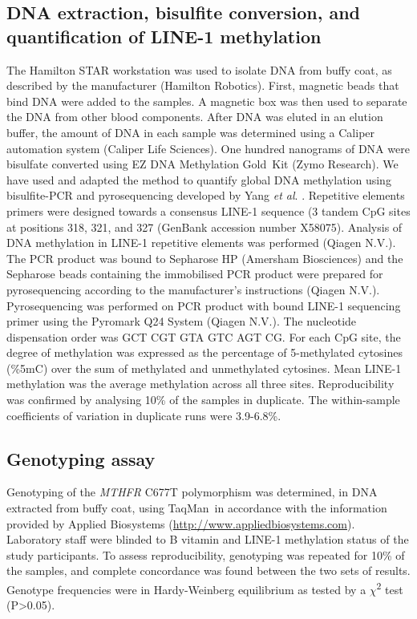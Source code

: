 \subsection{DNA extraction, bisulfite conversion, and quantification of LINE-1 methylation} %
\noindent The Hamilton STAR workstation was used to isolate DNA from buffy coat, as described by the manufacturer (Hamilton Robotics). First, magnetic beads that bind DNA were added to the samples. A magnetic box was then used to separate the DNA from other blood components. After DNA was eluted in an elution buffer, the amount of DNA in each sample was determined using a Caliper automation system (Caliper Life Sciences). One hundred nanograms of DNA were bisulfate converted using EZ DNA Methylation Gold\texttrademark~Kit (Zymo Research). We have used and adapted the method to quantify global DNA methylation using bisulfite-PCR and pyrosequencing developed by Yang \emph{et al}. \cite{c328}. Repetitive elements primers were designed towards a consensus LINE-1 sequence (3 tandem CpG sites at positions 318, 321, and 327 (GenBank accession number X58075). Analysis of DNA methylation in LINE-1 repetitive elements was performed (Qiagen N.V.). The PCR product was bound to Sepharose HP (Amersham Biosciences) and the Sepharose beads containing the immobilised PCR product were prepared for pyrosequencing according to the manufacturer's instructions (Qiagen N.V.). Pyrosequencing was performed on PCR product with bound LINE-1 sequencing primer using the Pyromark Q24 System (Qiagen N.V.). The nucleotide dispensation order was GCT CGT GTA GTC AGT CG. For each CpG site, the degree of methylation was expressed as the percentage of 5-methylated cytosines (\%5mC) over the sum of methylated and unmethylated cytosines. Mean LINE-1 methylation was the average methylation across all three sites. Reproducibility was confirmed by analysing 10\% of the samples in duplicate. The within-sample coefficients of variation in duplicate runs were 3.9-6.8\%.

\subsection{Genotyping assay} %
\noindent Genotyping of the \emph{MTHFR} C677T polymorphism was determined, in DNA extracted from buffy coat, using TaqMan\textregistered~in accordance with the information provided by Applied Biosystems (\href{http://www.appliedbiosystems.com}{http://www.appliedbiosystems.com}). Laboratory staff were blinded to B vitamin and LINE-1 methylation status of the study participants. To assess reproducibility, genotyping was repeated for 10\% of the samples, and complete concordance was found between the two sets of results. Genotype frequencies were in Hardy-Weinberg equilibrium as tested by a $\chi$\textsuperscript{2} test (P>0.05).

